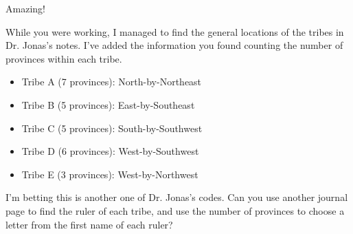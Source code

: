 Amazing!

While you were working, I managed to find the general locations of the tribes in
Dr. Jonas's notes. I've added the information you found counting the number
of provinces within each tribe.
\begin{itemize}
\item Tribe A (7 provinces): North-by-Northeast
\item Tribe B (5 provinces): East-by-Southeast
\item Tribe C (5 provinces): South-by-Southwest
\item Tribe D (6 provinces): West-by-Southwest
\item Tribe E (3 provinces): West-by-Northwest
\end{itemize}

I'm betting this is another one of Dr. Jonas's codes. Can you use another
journal page to find the ruler
of each tribe, and use the number of provinces to choose a letter from the
first name of each ruler?
%
%

